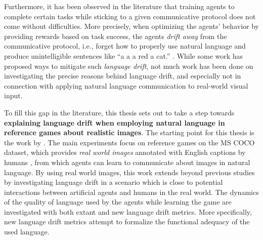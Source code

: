 Furthermore, it has been observed in the literature that training agents to complete certain tasks while sticking to a given communicative protocol does not come without difficulties. More precisely, when optimizing the agents' behavior by providing rewards based on task success, the agents \textit{drift away} from the communicative protocol, i.e., forget how to properly use natural language and produce unintelligible sentences like ``a a a red a cat.'' \parencite{lee2019countering, lazaridou2020multi, lu2020countering, lewis2017deal}. While some work has proposed ways to mitigate such \textit{language drift}, not much work has been done on investigating the precise reasons behind language drift, and especially not in connection with applying natural language communication to real-world visual input. 

To fill this gap in the literature, this thesis sets out to take a step towards \textbf{explaining language drift when employing natural language in reference games about realistic images}. The starting point for this thesis is the work by \cite{lazaridou2020multi}. The main  experiments focus on reference games on the MS COCO dataset, which provides \textit{real world images} annotated with English captions by humans \parencite{chen2015microsoft}, from which agents can learn to communicate about images in natural language. By using real world images, this work extends beyond previous studies by investigating language drift in a scenario which is close to potential interactions between artificial agents and humans in the real world. 
The dynamics of the quality of language used by the agents while learning the game are investigated with both extant and new language drift metrics. More specifically, new language drift metrics attempt to formalize the functional adequacy of the used language. 
